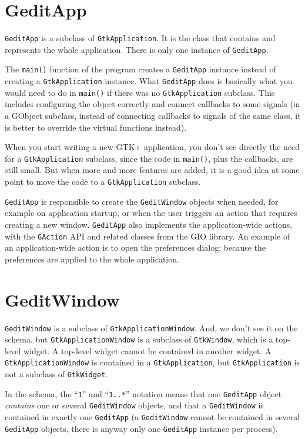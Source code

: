 \section{GeditApp}

\lstinline{GeditApp} is a subclass of \lstinline{GtkApplication}. It is the class that contains and represents the whole application. There is only one instance of \lstinline{GeditApp}.

The \lstinline{main()} function of the program creates a \lstinline{GeditApp} instance instead of creating a \lstinline{GtkApplication} instance. What \lstinline{GeditApp} does is basically what you would need to do in \lstinline{main()} if there was no \lstinline{GtkApplication} subclass. This includes configuring the object correctly and connect callbacks to some signals (in a GObject subclass, instead of connecting callbacks to signals of the same class, it is better to override the virtual functions instead).

When you start writing a new GTK+ application, you don't see directly the need for a \lstinline{GtkApplication} subclass, since the code in \lstinline{main()}, plus the callbacks, are still small. But when more and more features are added, it is a good idea at some point to move the code to a \lstinline{GtkApplication} subclass.

\lstinline{GeditApp} is responsible to create the \lstinline{GeditWindow} objects when needed, for example on application startup, or when the user triggers an action that requires creating a new window. \lstinline{GeditApp} also implements the application-wide actions, with the \lstinline{GAction} API and related classes from the GIO library. An example of an application-wide action is to open the preferences dialog; because the preferences are applied to the whole application.

\section{GeditWindow}

\lstinline{GeditWindow} is a subclass of \lstinline{GtkApplicationWindow}. And, we don't see it on the schema, but \lstinline{GtkApplicationWindow} is a subclass of \lstinline{GtkWindow}, which is a top-level widget. A top-level widget cannot be contained in another widget. A \lstinline{GtkApplicationWindow} is contained in a \lstinline{GtkApplication}, but \lstinline{GtkApplication} is not a subclass of \lstinline{GtkWidget}.

In the schema, the ``\texttt{1}'' and ``\texttt{1..*}'' notation means that one \lstinline{GeditApp} object \emph{contains} one or several \lstinline{GeditWindow} objects, and that a \lstinline{GeditWindow} is contained in exactly one \lstinline{GeditApp} (a \lstinline{GeditWindow} cannot be contained in several \lstinline{GeditApp} objects, there is anyway only one \lstinline{GeditApp} instance per process).

